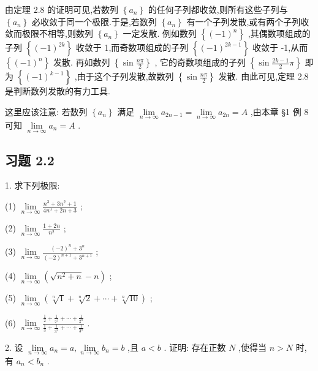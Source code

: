 由定理 2.8 的证明可见,若数列 \(\left\{  {a}_{n}\right\}\) 的任何子列都收敛,则所有这些子列与 \(\left\{  {a}_{n}\right\}\) 必收敛于同一个极限.于是,若数列 \(\left\{  {a}_{n}\right\}\) 有一个子列发散,或有两个子列收敛而极限不相等,则数列 \(\left\{  {a}_{n}\right\}\) 一定发散. 例如数列 \(\left\{  {\left( -1\right) }^{n}\right\}\) ,其偶数项组成的子列 \(\left\{  {\left( -1\right) }^{2k}\right\}\) 收敛于 1,而奇数项组成的子列 \(\left\{  {\left( -1\right) }^{{2k} - 1}\right\}\) 收敛于 -1,从而 \(\left\{  {\left( -1\right) }^{n}\right\}\) 发散. 再如数列 \(\left\{  {\sin \frac{n\pi }{2}}\right\}\) , 它的奇数项组成的子列 \(\left\{  {\sin \frac{{2k} - 1}{2}\pi }\right\}\) 即为 \(\left\{  {\left( -1\right) }^{k - 1}\right\}\) ,由于这个子列发散,故数列 \(\left\{  {\sin \frac{n\pi }{2}}\right\}\) 发散. 由此可见,定理 2.8 是判断数列发散的有力工具.

这里应该注意: 若数列 \(\left\{  {a}_{n}\right\}\) 满足 \(\mathop{\lim }\limits_{{n \rightarrow  \infty }}{a}_{{2n} - 1} = \mathop{\lim }\limits_{{n \rightarrow  \infty }}{a}_{2n} = A\) ,由本章 §1 例 8 可知 \(\mathop{\lim }\limits_{{n \rightarrow  \infty }}{a}_{n} = A\) .

\subsection{习题 2.2}

1. 求下列极限:

(1) \(\mathop{\lim }\limits_{{n \rightarrow  \infty }}\frac{{n}^{3} + 3{n}^{2} + 1}{4{n}^{3} + {2n} + 3}\) ;

(2) \(\mathop{\lim }\limits_{{n \rightarrow  \infty }}\frac{1 + {2n}}{{n}^{2}}\) ;

(3) \(\mathop{\lim }\limits_{{n \rightarrow  \infty }}\frac{{\left( -2\right) }^{n} + {3}^{n}}{{\left( -2\right) }^{n + 1} + {3}^{n + 1}}\) ;

(4) \(\mathop{\lim }\limits_{{n \rightarrow  \infty }}\left( {\sqrt{{n}^{2} + n} - n}\right)\) ;

(5) \(\mathop{\lim }\limits_{{n \rightarrow  \infty }}\left( {\sqrt[n]{1} + \sqrt[n]{2} + \cdots  + \sqrt[n]{10}}\right)\) ;

(6) \(\mathop{\lim }\limits_{{n \rightarrow  \infty }}\frac{\frac{1}{2} + \frac{1}{{2}^{2}} + \cdots  + \frac{1}{{2}^{n}}}{\frac{1}{3} + \frac{1}{{3}^{2}} + \cdots  + \frac{1}{{3}^{n}}}\) .

2. 设 \(\mathop{\lim }\limits_{{n \rightarrow  \infty }}{a}_{n} = a,\mathop{\lim }\limits_{{n \rightarrow  \infty }}{b}_{n} = b\) ,且 \(a < b\) . 证明: 存在正数 \(N\) ,使得当 \(n > N\) 时,有 \({a}_{n} < {b}_{n}\) .


